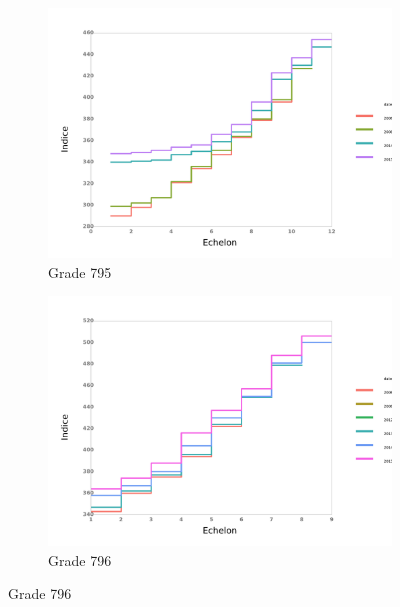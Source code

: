 \documentclass[11pt,a4paper]{article}
\begin{document}
\begin{figure}[ht]
\begin{subfigure}[b]{0.55\linewidth}
  \end{subfigure} 
  \begin{subfigure}[b]{0.55\linewidth}
        \caption{Grade 795} 
    \label{echelon_by_neg_2} 
    \centering
    \includegraphics[width=1\linewidth]{2_grille_by_neg.pdf} 
  \end{subfigure}%
  \begin{subfigure}[b]{0.55\linewidth}
        \caption{Grade 796} 
    \label{echelon_by_neg_3} 
    \centering
    \includegraphics[width=1\linewidth]{3_grille_by_neg.pdf} 
  \end{subfigure} 
\end{figure}
\end{document}
